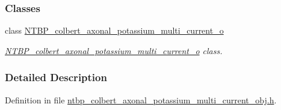 \subsubsection*{Classes}
\begin{DoxyCompactItemize}
\item 
class \hyperlink{class_n_t_b_p__colbert__axonal__potassium__multi__current__o}{NTBP\_\-colbert\_\-axonal\_\-potassium\_\-multi\_\-current\_\-o}
\begin{DoxyCompactList}\small\item\em \hyperlink{class_n_t_b_p__colbert__axonal__potassium__multi__current__o}{NTBP\_\-colbert\_\-axonal\_\-potassium\_\-multi\_\-current\_\-o} class. \item\end{DoxyCompactList}\end{DoxyCompactItemize}


\subsubsection{Detailed Description}


Definition in file \hyperlink{ntbp__colbert__axonal__potassium__multi__current__obj_8h_source}{ntbp\_\-colbert\_\-axonal\_\-potassium\_\-multi\_\-current\_\-obj.h}.


